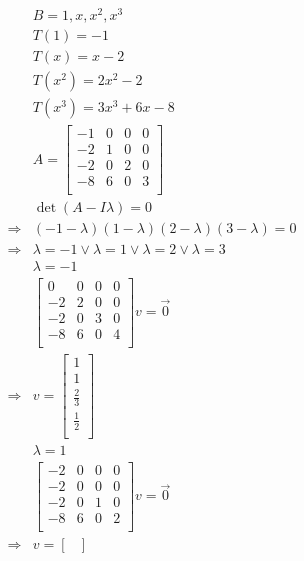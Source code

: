 \documentclass{article}
\begin{document}
\begin{equation*}
    \begin{split}
        &B={1,x,x^2,x^3}\\
        &T(1)=-1\\
        &T(x)=x-2\\
        &T(x^2)=2x^2-2\\
        &T(x^3)=3x^3+6x-8\\
        &A=\begin{bmatrix}
            -1&0&0&0\\
            -2&1&0&0\\
            -2&0&2&0\\
            -8&6&0&3\\
        \end{bmatrix}\\
        &\det(A-I\lambda)=0\\
        \Rightarrow&(-1-\lambda)(1-\lambda)(2-\lambda)(3-\lambda)=0\\
        \Rightarrow&\lambda=-1\lor\lambda=1\lor\lambda=2\lor\lambda=3\\
        &\lambda=-1\\
        &\begin{bmatrix}
            0&0&0&0\\
            -2&2&0&0\\
            -2&0&3&0\\
            -8&6&0&4\\
        \end{bmatrix}v=\overrightarrow{0}\\
        \Rightarrow&v=\begin{bmatrix}
            1\\
            1\\
            \frac{2}{3}\\
            \frac{1}{2}\\
        \end{bmatrix}\\
        &\lambda=1\\
        &\begin{bmatrix}
            -2&0&0&0\\
            -2&0&0&0\\
            -2&0&1&0\\
            -8&6&0&2\\
        \end{bmatrix}v=\overrightarrow{0}\\
        \Rightarrow&v=\begin{bmatrix}

\end{bmatrix}
\end{split}
\end{equation*}
\end{document}
